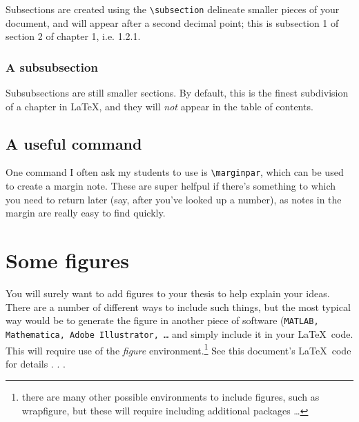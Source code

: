 Subsections are created using the \texttt{\textbackslash subsection} delineate smaller pieces of your document, and will appear after a second decimal point; this is subsection 1 of section 2 of chapter 1, i.e. 1.2.1.

\subsubsection{A subsubsection}

Subsubsections are still smaller sections.  By default, this is the finest subdivision of a chapter in \LaTeX, and they will \emph{not} appear in the table of contents.  

\subsection{A useful command}

One command I often ask my students to use is \texttt{\textbackslash marginpar}, which can be used to create a margin note.  These are super helfpul if there's something to which you need to return later (say, after you've looked up a number), as notes in the margin are really easy to find quickly.  

\section{Some figures}

You will surely want to add figures to your thesis to help explain your ideas.  There are a number of different ways to include such things, but the most typical way would be to generate the figure in another piece of software (\texttt{MATLAB, Mathematica, Adobe Illustrator, \ldots} and simply include it in your \LaTeX ~code.  This will require use of the \emph{figure} environment.\footnote{there are many other possible environments to include figures, such as wrapfigure, but these will require including additional packages \ldots}  See this document's \LaTeX ~code for details . . .

